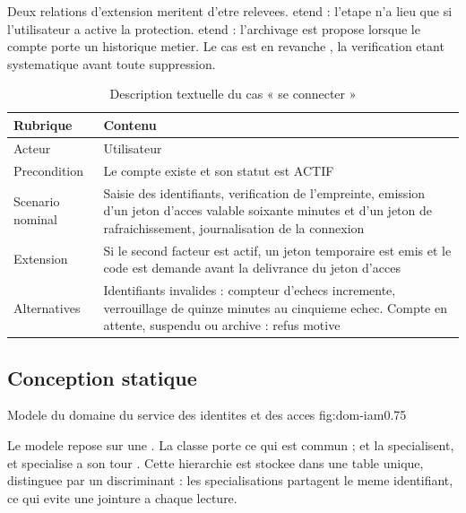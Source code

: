 Deux relations d'extension meritent d'etre relevees.  etend  : l'etape n'a lieu que si
l'utilisateur a active la protection.  etend
 : l'archivage est propose lorsque le compte
porte un historique metier. Le cas  est en revanche , la verification etant
systematique avant toute suppression.

\begin{table}[H]
\centering
\caption{Description textuelle du cas « se connecter »}
\label{tab:desc-connexion}
\small
\begin{tabularx}{\textwidth}{@{}p{2.5cm}X@{}}
\toprule
\textbf{Rubrique} & \textbf{Contenu} \\ \midrule
Acteur & Utilisateur \\
Precondition & Le compte existe et son statut est ACTIF \\
Scenario nominal & Saisie des identifiants, verification de l'empreinte,
  emission d'un jeton d'acces valable soixante minutes et d'un jeton de
  rafraichissement, journalisation de la connexion \\
Extension & Si le second facteur est actif, un jeton temporaire est emis
  et le code est demande avant la delivrance du jeton d'acces \\
Alternatives & Identifiants invalides : compteur d'echecs incremente,
  verrouillage de quinze minutes au cinquieme echec. Compte en attente,
  suspendu ou archive : refus motive \\
\bottomrule
\end{tabularx}
\end{table}

\subsection{Conception statique}

  {Modele du domaine du service des identites et des acces}
  {fig:dom-iam}{0.75}

Le modele repose sur une . La classe
 porte ce qui est commun ;  et
 la specialisent, et  specialise a son
tour . Cette hierarchie est stockee dans une table
unique, distinguee par un discriminant : les specialisations partagent le
meme identifiant, ce qui evite une jointure a chaque lecture.

